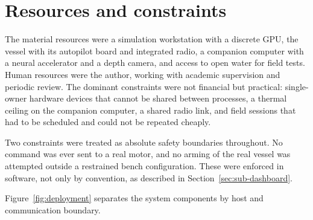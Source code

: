 \documentclass[a4paper,12pt,oneside,openany]{report}
\begin{document}
\section{Resources and constraints}

The material resources were a simulation workstation with a discrete GPU, the vessel with its
autopilot board and integrated radio, a companion computer with a neural accelerator and a depth
camera, and access to open water for field tests. Human resources were the author, working with
academic supervision and periodic review. The dominant constraints were not financial but
practical: single-owner hardware devices that cannot be shared between processes, a thermal ceiling
on the companion computer, a shared radio link, and field sessions that had to be scheduled and
could not be repeated cheaply.

Two constraints were treated as absolute safety boundaries throughout. No command was ever sent to
a real motor, and no arming of the real vessel was attempted outside a restrained bench
configuration. These were enforced in software, not only by convention, as described in
Section~\ref{sec:sub-dashboard}.

Figure~\ref{fig:deployment} separates the system components by host and communication boundary.
\end{document}
